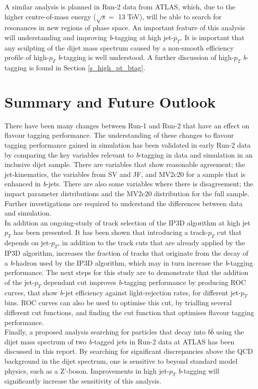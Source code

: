 \documentclass[12pt, onecolumn,notitlepage]{article}
\begin{document}
A similar analysis is planned in Run-2 data from ATLAS, which, due to the higher centre-of-mass energy ($\sqrt{s} =$ 13 TeV), 
will be able to search for resonances in new regions of phase space.
An important feature of this analysis will understanding and improving \textit{b}-tagging at high jet-$p_T$. 
It is important that any sculpting of the dijet mass spectrum caused by a non-smooth efficiency profile of 
high-$p_T$ \textit{b}-tagging is well understood.
A further discussion of high-$p_T$ \textit{b}-tagging is found in Section \ref{s_high_pt_btag}.

\section*{Summary and Future Outlook}

There have been many changes between Run-1 and Run-2 that have an effect on flavour tagging performance.
The understanding of these changes to flavour tagging performance gained in simulation has been validated in early
Run-2 data by comparing the key variables relevant to \textit{b}-tagging in data and simulation in an inclusive dijet sample.
There are variables that show reasonable agreement; the jet-kinematics, the variables from SV and JF,
and MV2c20 for a sample that is enhanced in \textit{b}-jets.
There are also some variables where there is disagreement; the impact parameter distributions and the MV2c20 distribution for the full sample.
Further investigations are required to understand the differences between data and simulation. \\

In addition an ongoing-study of track selection of the IP3D algorithm at high jet $p_T$ has been presented.
It has been shown that introducing a track-$p_T$ cut that depends on jet-$p_T$, 
in addition to the track cuts that are already applied by the IP3D algorithm,
increases the fraction of tracks that originate from the decay of a \textit{b}-hadron used by the IP3D algorithm,
which may in turn increase the \textit{b}-tagging performance.
The next steps for this study are to demonstrate that the addition of the jet-$p_T$ dependant cut improves \textit{b}-tagging performance by 
producing ROC curves, that show \textit{b}-jet efficiency against light-rejection rates, for different jet-$p_T$ bins.
ROC curves can also be used to optimise this cut, by trialling several different cut functions, and finding the cut function that optimises flavour tagging performance. \\

Finally, a proposed analysis searching for particles that decay into $b\bar{b}$ using
the dijet mass spectrum of two \textit{b}-tagged jets in Run-2 data at ATLAS has been discussed in this report.
By searching for significant discrepancies above the QCD background in the dijet spectrum, one is sensitive to beyond standard model physics,
such as a Z'-boson.
Improvements in high jet-$p_T$ \textit{b}-tagging will significantly increase the sensitivity of this analysis. 

\newpage


\end{document}
